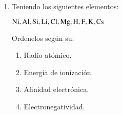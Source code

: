 \begin{enumerate}
    \item Teniendo los siguientes elementos:
    
    \hfil$\ce{Ni, Al, Si, Li, Cl, Mg, H, F, K, Cs}$\hfil

    Ordenelos según su:

    \begin{enumerate}
        \item Radio atómico.
        \item Energía de ionización.
        \item Afinidad electrónica.
        \item Electronegatividad.
    \end{enumerate}
\end{enumerate}
